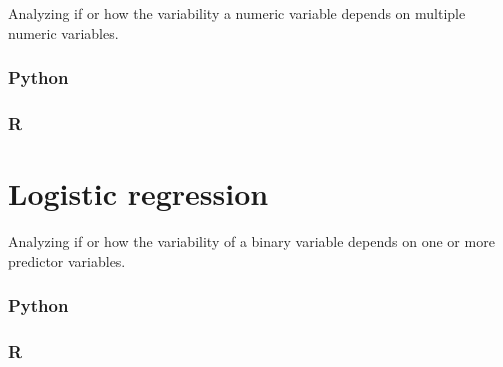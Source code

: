 \documentclass[
]{book}
\begin{document}
Analyzing if or how the variability a numeric variable depends on multiple numeric variables.

\hypertarget{python-37}{%
\subsubsection*{Python}\label{python-37}}

\hypertarget{r-37}{%
\subsubsection*{R}\label{r-37}}

\hypertarget{logistic-regression}{%
\section{Logistic regression}\label{logistic-regression}}

Analyzing if or how the variability of a binary variable depends on one or more predictor variables.

\hypertarget{python-38}{%
\subsubsection*{Python}\label{python-38}}

\hypertarget{r-38}{%
\subsubsection*{R}\label{r-38}}

  
\end{document}
